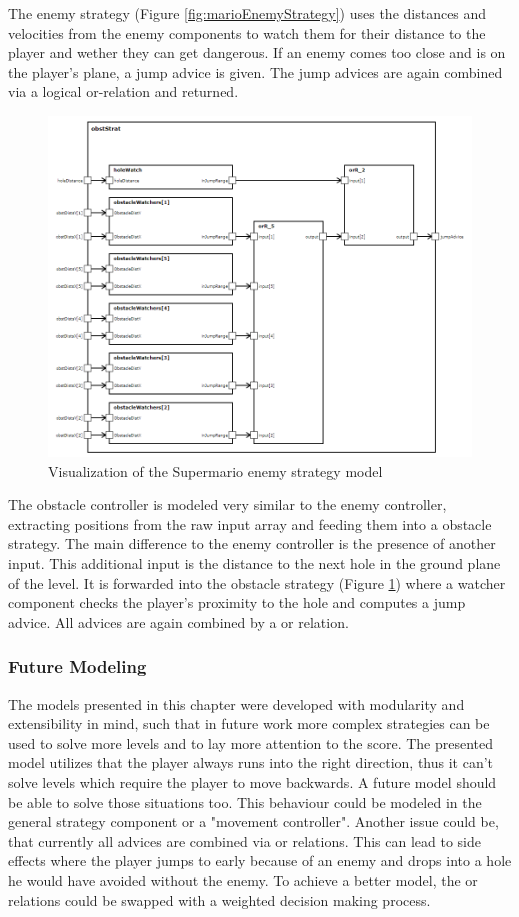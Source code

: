 The enemy strategy (Figure \ref{fig:marioEnemyStrategy}) uses the distances and velocities from the enemy components to watch them for their distance to the player and wether they can get dangerous. If an enemy comes too close and is on the player's plane, a jump advice is given. The jump advices are again combined via a logical or-relation and returned.

\begin{figure}
	\centering
	\includegraphics[scale=0.4]{pictures/haller_obstaclestrategy.PNG}
	\caption{Visualization of the Supermario enemy strategy model}
	\label{fig:marioObstacleStrategy}
\end{figure}

The obstacle controller is modeled very similar to the enemy controller, extracting positions from the raw input array and feeding them into a obstacle strategy. The main difference to the enemy controller is the presence of another input. This additional input is the distance to the next hole in the ground plane of the level. It is forwarded into the obstacle strategy (Figure \ref{fig:marioObstacleStrategy}) where a watcher component checks the player's proximity to the hole and computes a jump advice. All advices are again combined by a or relation.

\subsubsection{Future Modeling}
The models presented in this chapter were developed with modularity and extensibility in mind, such that in future work more complex strategies can be used to solve more levels and to lay more attention to the score.
The presented model utilizes that the player always runs into the right direction, thus it can't solve levels which require the player to move backwards. A future model should be able to solve those situations too. This behaviour could be modeled in the general strategy component or a "movement controller".
Another issue could be, that currently all advices are combined via or relations. This can lead to side effects where the player jumps to early because of an enemy and drops into a hole he would have avoided without the enemy. To achieve a better model, the or relations could be swapped with a weighted decision making process.